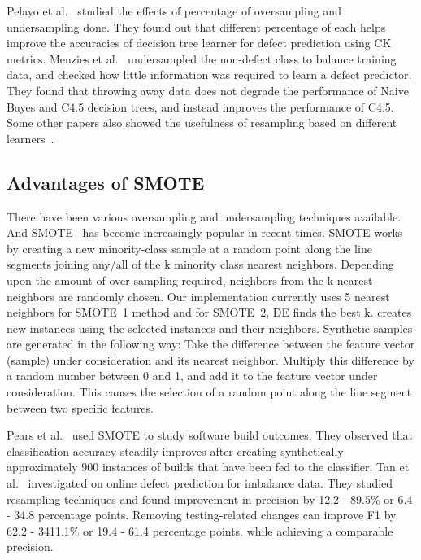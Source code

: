 \documentclass[sigconf,review, anonymous]{acmart}
\theoremstyle{break}
\begin{document}
Pelayo et al.~\cite{pelayo2007applying} studied the effects of percentage of oversampling and undersampling done. They found out that different percentage of each helps improve the accuracies of decision tree learner for defect prediction using CK metrics. Menzies et al.~\cite{menzies2008implications} undersampled the non-defect class to balance training
data, and checked how little information was required to learn a defect predictor. They found that throwing away data does not degrade the performance of Naive Bayes and C4.5 decision trees, and instead improves the performance of C4.5. Some other papers also showed the usefulness of resampling based on different learners~\cite{pelayo2007applying, pelayo2012evaluating, riquelme2008finding}.

\subsection{Advantages of SMOTE}
\label{sect:smote}

There have been various oversampling and undersampling techniques available. And SMOTE~\cite{chawla2002smote} has become increasingly popular in recent times. SMOTE works by creating a new minority-class sample at a random point along the line
segments joining any/all of the k minority class nearest neighbors. Depending upon the
amount of over-sampling required, neighbors from the k nearest neighbors are randomly
chosen. Our implementation currently uses 5 nearest neighbors for SMOTE~1 method and for SMOTE~2, DE finds the best k. creates new instances using the selected instances and their neighbors. Synthetic samples
are generated in the following way: Take the difference between the feature vector (sample)
under consideration and its nearest neighbor. Multiply this difference by a random number
between 0 and 1, and add it to the feature vector under consideration. This causes the
selection of a random point along the line segment between two specific features.

Pears et al.~\cite{pears2014synthetic} used SMOTE to study software build outcomes. They observed
that classification accuracy steadily improves after creating synthetically approximately 900 instances of builds that have been fed to the classifier. Tan et al.~\cite{tan2015online} investigated on online defect prediction for imbalance data. They studied resampling techniques and found improvement in precision by 12.2 - 89.5\% or 6.4 - 34.8 percentage points. Removing testing-related changes can improve F1 by 62.2 - 3411.1\% or 19.4 - 61.4 percentage points. while achieving a comparable precision.
\end{document}
